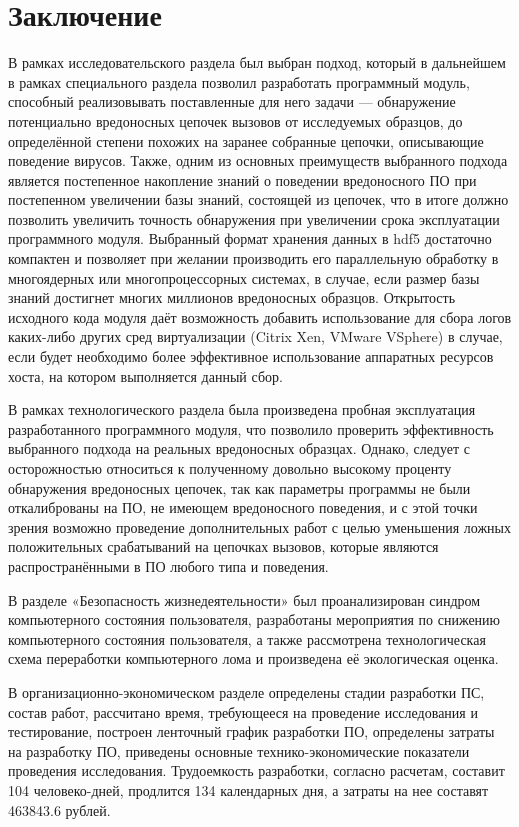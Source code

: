 \section* {Заключение}
В рамках исследовательского раздела был выбран подход, который в дальнейшем в рамках специального раздела позволил разработать программный модуль, способный реализовывать поставленные для него задачи --- обнаружение потенциально вредоносных цепочек вызовов от исследуемых образцов, до определённой степени похожих на заранее собранные цепочки, описывающие поведение вирусов. Также, одним из основных преимуществ выбранного подхода является постепенное накопление знаний о поведении вредоносного ПО при постепенном увеличении базы знаний, состоящей из цепочек, что в итоге должно позволить увеличить точность обнаружения при увеличении срока эксплуатации программного модуля. Выбранный формат хранения данных в hdf5 достаточно компактен и позволяет при желании производить его параллельную обработку в многоядерных или многопроцессорных системах, в случае, если размер базы знаний достигнет многих миллионов вредоносных образцов. Открытость исходного кода модуля даёт возможность добавить использование для сбора логов каких-либо других сред виртуализации (Citrix Xen, VMware VSphere) в случае, если будет необходимо более эффективное использование аппаратных ресурсов хоста, на котором выполняется данный сбор.

В рамках технологического раздела была произведена пробная эксплуатация разработанного программного модуля, что позволило проверить эффективность выбранного подхода на реальных вредоносных образцах. Однако, следует с осторожностью относиться к полученному довольно высокому проценту обнаружения вредоносных цепочек, так как параметры программы не были откалиброваны на ПО, не имеющем вредоносного поведения, и с этой точки зрения возможно проведение дополнительных работ с целью уменьшения ложных положительных срабатываний на цепочках вызовов, которые являются распространёнными в ПО любого типа и поведения.

В разделе «Безопасность жизнедеятельности» был проанализирован синдром компьютерного состояния пользователя, разработаны мероприятия по снижению компьютерного состояния пользователя, а также рассмотрена технологическая схема переработки компьютерного лома и произведена её экологическая оценка.

В организационно-экономическом разделе определены стадии разработки ПС, состав работ, рассчитано время, требующееся на проведение исследования и тестирование, построен ленточный график разработки ПО, определены затраты на разработку ПО, приведены основные технико-экономические показатели проведения исследования. 
Трудоемкость разработки, согласно расчетам, составит 104 человеко-дней, продлится 134 календарных дня, а затраты на нее составят 463843.6 рублей.

